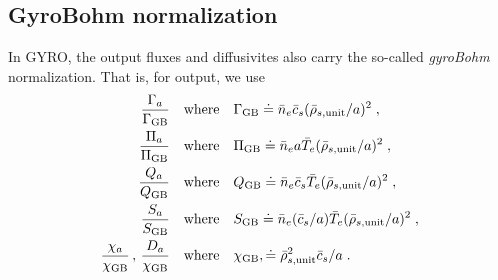 \subsection{GyroBohm normalization}

In GYRO, the output fluxes and diffusivites also carry the so-called 
{\it gyroBohm} normalization.  That is, for output, we use
%
\begin{align}
\frac{\Gamma_a}{\Gamma_{\rm GB}} & \quad \mbox{where} \quad 
 \Gamma_{\rm GB} \doteq {\bar n}_e {\bar c}_s (\bar{\rho}_{s,{\rm unit}}/a)^2 \; , \\
\frac{\Pi_a}{\Pi_{\rm GB}} & \quad \mbox{where} \quad
 \Pi_{\rm GB} \doteq {\bar n}_e a {\bar T}_e (\bar{\rho}_{s,{\rm unit}}/a)^2 \; , \\
\frac{Q_a}{Q_{\rm GB}} & \quad \mbox{where} \quad
 Q_{\rm GB} \doteq {\bar n}_e {\bar c}_s {\bar T}_e (\bar{\rho}_{s,{\rm unit}}/a)^2 \; , \\
\frac{S_a}{S_{\rm GB}} & \quad \mbox{where} \quad
S_{\rm GB} \doteq {\bar n}_e ({\bar c}_s/a) {\bar T}_e (\bar{\rho}_{s,{\rm unit}}/a)^2 \; , \\
\frac{\chi_a}{\chi_{\rm GB}} \, , \, \frac{D_a}{\chi_{\rm GB}}
& \quad \mbox{where} \quad \chi_{\rm GB}, \doteq \bar{\rho}_{s,{\rm unit}}^2 {\bar c}_s/a \; .
\end{align}
